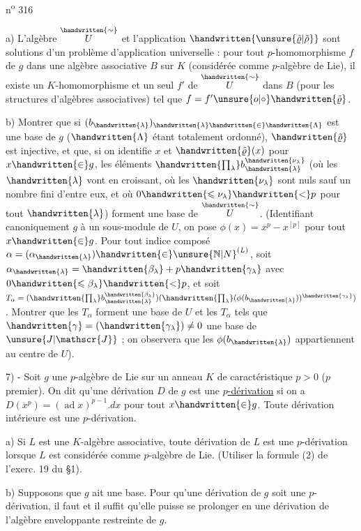 \hfill n\textsuperscript{o} 316

a) L'algèbre $\overset{\handwritten{\sim}}{U}$ et l'application $\handwritten{\unsure{\tilde{\varrho}|\tilde{\rho}}}$ sont solutions d'un problème d'application universelle : pour tout $p$-homomorphisme $f$ de $g$ dans une algèbre associative $B$ sur $K$ (considérée comme $p$-algèbre de Lie), il existe un $K$-homomorphisme et un seul $f'$ de $\overset{\handwritten{\sim}}{U}$ dans $B$ (pour les structures d'algèbres associatives) tel que $f=f'\unsure{o|\circ}\handwritten{\tilde{\varrho}}$.

b) Montrer que si $(b_{\handwritten{\lambda}})_{\handwritten{\lambda}\handwritten{\in}\handwritten{\Lambda}}$ est une base de $g$ ($\handwritten{\Lambda}$ étant totalement ordonné), $\handwritten{\tilde{\varrho}}$ est injective, et que, si on identifie $x$ et $\handwritten{\tilde{\varrho}}(x)$ pour $x\handwritten{\in} g$, les éléments $\handwritten{\prod_{\lambda}}b_{\handwritten{\lambda}}^{\handwritten{\nu_{\lambda}}}$ (où les $\handwritten{\lambda}$ vont en croissant, où les $\handwritten{\nu_{\lambda}}$ sont nuls sauf un nombre fini d'entre eux, et où $0\handwritten{\leqslant\nu_{\lambda}}\handwritten{<}p$ pour tout $\handwritten{\lambda}$) forment une base de $\overset{\handwritten{\sim}}{U}$. (Identifiant canoniquement $g$ à un sous-module de $U$, on pose $\phi(x)=x^{p}-x^{[p]}$ pour tout $x\handwritten{\in} g$. Pour tout indice composé $\alpha=(\alpha_{\handwritten{\lambda}})\handwritten{\in}\unsure{\mathbb{N}|N}^{(L)}$, soit $\alpha_{\handwritten{\lambda}}=\handwritten{\beta_{\lambda}}+p\handwritten{\gamma_{\lambda}}$ avec $0\handwritten{\leqslant\beta_{\lambda}}\handwritten{<}p$, et soit $T_{\alpha}=(\handwritten{\prod_{\lambda}}b_{\handwritten{\lambda}}^{\handwritten{\beta_{\lambda}}})(\handwritten{\prod_{\lambda}}(\phi(b_{\handwritten{\lambda}}))^{\handwritten{\gamma_{\lambda}}})$. Montrer que les $T_{\alpha}$ forment une base de $U$ et les $T_{\alpha}$ tels que $\handwritten{\gamma}=(\handwritten{\gamma_{\lambda}})\ne 0$ une base de $\unsure{J|\mathscr{J}}$ ; on observera que les $\phi(b_{\handwritten{\lambda}})$ appartiennent au centre de $U$).

7) - Soit $g$ une $p$-algèbre de Lie sur un anneau $K$ de caractéristique $p>0$ ($p$ premier). On dit qu'une dérivation $D$ de $g$ est une $p$\uline{-dérivation} si on a $D(x^{p})=(\operatorname{ad}x)^{p-1}.dx$ pour tout $x\handwritten{\in} g$. Toute dérivation intérieure est une $p$-dérivation.

a) Si $L$ est une $K$-algèbre associative, toute dérivation de $L$ est une $p$-dérivation lorsque $L$ est considérée comme $p$-algèbre de Lie. (Utiliser la formule (2) de l'exerc. 19 du \S 1).

b) Supposons que $g$ ait une base. Pour qu'une dérivation de $g$ soit une $p$-dérivation, il faut et il suffit qu'elle puisse se prolonger en une dérivation de l'algèbre enveloppante restreinte de $g$.
